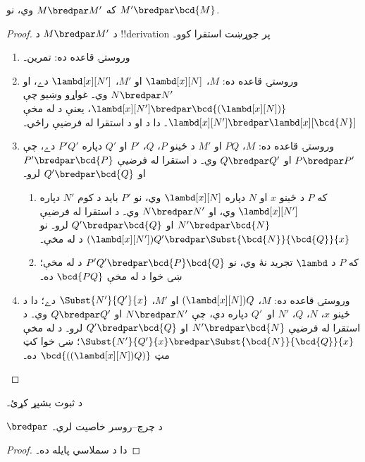 \documentclass[../../../include/open-logic-section]{subfiles}
\begin{document}
\begin{lem}
  که $M \bredpar M'$ وي، نو $M' \bredpar \bcd{M}$.
\end{lem}
\begin{proof}
  د $M \bredpar M'$ د !!{derivation} پر جوړښت استقرا کوو۔
  \begin{enumerate}
    \item وروستۍ قاعده  ده: تمرين۔
    \item وروستۍ قاعده  ده: $M$،
      $\lambd[x][N]$ او $M'$، $\lambd[x][N']$ دے، او
      $N \bredpar N'$ وي۔ غواړو وښيو چې $\lambd[x][N'] \bredpar
      \bcd{(\lambd[x][N])}$، يعنې د  له مخې
      $\lambd[x][N'] \bredpar \lambd[x][\bcd{N}]$۔ دا د
       او د استقرا له فرضيې راځي۔
    \item وروستۍ قاعده  ده: $M$، $PQ$ او $M'$
      د ځينو $P$، $Q$، $P'$ او $Q'$ دپاره $P'Q'$ دے، چې $P \bredpar P'$
      او $Q \bredpar Q'$ وي۔ د استقرا له فرضيې $P'
      \bredpar \bcd{P}$ او $Q' \bredpar \bcd{Q}$ لرو۔
      \begin{enumerate}
        \item که $P$ د ځينو $x$ او $N$ دپاره $\lambd[x][N]$ وي،
          نو $P'$ بايد د کوم $N'$ دپاره $\lambd[x][N']$ وي، او
          $N \bredpar N'$ وي۔ د استقرا له فرضيې $N' \bredpar \bcd{N}$ او
          $Q' \bredpar \bcd{Q}$ لرو۔ نو $(\lambd[x][N'])Q' \bredpar
          \Subst{\bcd{N}}{\bcd{Q}}{x}$ د  له مخې۔
        \item که $P$ د $\lambd$ تجريد نۀ وي، نو $P'Q' \bredpar
          \bcd{P}\bcd{Q}$ د  له مخې؛ ښۍ خوا
          د  له مخې $\bcd{PQ}$ ده۔
      \end{enumerate}
    \item وروستۍ قاعده  ده: $M$،
      $(\lambd[x][N])Q$ او $M'$، $\Subst{N'}{Q'}{x}$ دے؛ دا د ځينو $x$،
      $N$، $Q$، $N'$ او~$Q'$ دپاره دي، چې $N \bredpar N'$ او $Q \bredpar
      Q'$ وي۔ د استقرا له فرضيې $N' \bredpar \bcd{N}$ او
      $Q' \bredpar \bcd{Q}$ لرو۔ د  له مخې
      $\Subst{N'}{Q'}{x} \bredpar \Subst{\bcd{N}}{\bcd{Q}}{x}$؛
      ښۍ خوا کټ مټ $\bcd{((\lambd[x][N])Q)}$ ده۔
  \end{enumerate}
\end{proof}

\begin{prob}
  د  ثبوت بشپړ کړئ۔
\end{prob}

\begin{thm}
  $\bredpar$ د چرچ--روسر خاصيت لري۔
\end{thm}

\begin{proof}
  دا د  سملاسي پايله ده۔
\end{proof}
\end{document}
